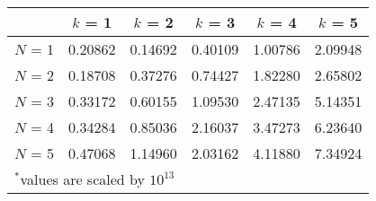 \documentclass{standalone}
\begin{document}
\begin{tabular}{@{} l *{5}{c} @{}}
    \toprule
    & $k$ = 1 & $k$ = 2 & $k$ = 3 & $k$ = 4 & $k$ = 5 \\
    \midrule
    $N$ = 1 & 0.20862 & 0.14692 & 0.40109 & 1.00786 & 2.09948 \\
    $N$ = 2 & 0.18708 & 0.37276 & 0.74427 & 1.82280 & 2.65802 \\
    $N$ = 3 & 0.33172 & 0.60155 & 1.09530 & 2.47135 & 5.14351 \\
    $N$ = 4 & 0.34284 & 0.85036 & 2.16037 & 3.47273 & 6.23640 \\
    $N$ = 5 & 0.47068 & 1.14960 & 2.03162 & 4.11880 & 7.34924 \\
    \midrule
    \multicolumn{6}{l}{\footnotesize $^*$values are scaled by $10^{13}$} \\
    \bottomrule
\end{tabular}
\end{document}
